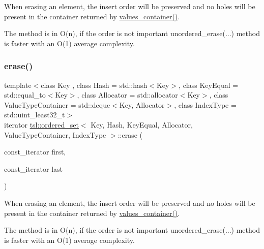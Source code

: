 When erasing an element, the insert order will be preserved and no holes will be present in the container returned by \textquotesingle{}\mbox{\hyperlink{classtsl_1_1ordered__set_a1bc951514a5c4c29c14b6cf5177cf1ec}{values\+\_\+container()}}\textquotesingle{}.

The method is in O(n), if the order is not important \textquotesingle{}unordered\+\_\+erase(...)\textquotesingle{} method is faster with an O(1) average complexity. \mbox{\label{classtsl_1_1ordered__set_a318c0fb661e5e389f82bcb9f157db45d}} 
\subsubsection{\texorpdfstring{erase()}{erase()}\hspace{0.1cm}{\footnotesize\ttfamily [3/7]}}
{\footnotesize\ttfamily template$<$class Key , class Hash  = std\+::hash$<$\+Key$>$, class Key\+Equal  = std\+::equal\+\_\+to$<$\+Key$>$, class Allocator  = std\+::allocator$<$\+Key$>$, class Value\+Type\+Container  = std\+::deque$<$\+Key, Allocator$>$, class Index\+Type  = std\+::uint\+\_\+least32\+\_\+t$>$ \\
iterator \mbox{\hyperlink{classtsl_1_1ordered__set}{tsl\+::ordered\+\_\+set}}$<$ Key, Hash, Key\+Equal, Allocator, Value\+Type\+Container, Index\+Type $>$\+::erase (\begin{DoxyParamCaption}\item[{const\+\_\+iterator}]{first,  }\item[{const\+\_\+iterator}]{last }\end{DoxyParamCaption})\hspace{0.3cm}{\ttfamily [inline]}}





When erasing an element, the insert order will be preserved and no holes will be present in the container returned by \textquotesingle{}\mbox{\hyperlink{classtsl_1_1ordered__set_a1bc951514a5c4c29c14b6cf5177cf1ec}{values\+\_\+container()}}\textquotesingle{}.

The method is in O(n), if the order is not important \textquotesingle{}unordered\+\_\+erase(...)\textquotesingle{} method is faster with an O(1) average complexity. \mbox{\label{classtsl_1_1ordered__set_a4a1e1054dd9e86fc0617070ad35f8d45}} 
